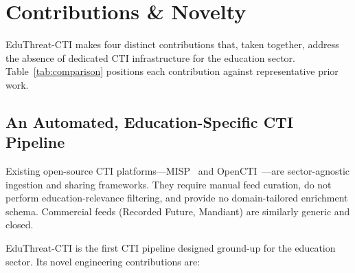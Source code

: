 \documentclass[sigconf,anonymous]{acmart}
\newcommand{\sys}{EduThreat-CTI\xspace}
\begin{document}
\section{Contributions \& Novelty}\label{sec:contributions}

\sys makes four distinct contributions that, taken together, address the absence of dedicated CTI infrastructure for the education sector. Table~\ref{tab:comparison} positions each contribution against representative prior work.

\subsection{An Automated, Education-Specific CTI Pipeline}\label{sec:contrib:system}

Existing open-source CTI platforms---MISP~\cite{wagner2016misp} and OpenCTI~\cite{opencti}---are sector-agnostic ingestion and sharing frameworks. They require manual feed curation, do not perform education-relevance filtering, and provide no domain-tailored enrichment schema. Commercial feeds (Recorded Future, Mandiant) are similarly generic and closed.

\sys is the first CTI pipeline designed ground-up for the education sector. Its novel engineering contributions are:
\end{document}
